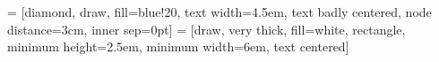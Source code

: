 

\usepackage[english]{babel} 
\usepackage{amsthm} 

\usepackage{algorithm}
\usepackage{algorithmic}
\usepackage{amssymb}
\usepackage{graphicx}
\usepackage{wrapfig}
\usepackage{blkarray, bigstrut}
\usepackage{bm}
\usepackage{ stmaryrd } 

\usepackage{romannum}

\usepackage[normalem]{ulem}
\usepackage{mathpartir}
\usepackage{color}
\usepackage{subcaption} %
\usepackage{mathtools}
\DeclarePairedDelimiter{\ceil}{\lceil}{\rceil}
\DeclarePairedDelimiter{\floor}{\lfloor}{\rfloor}
\usepackage{fourier} 
\usepackage{tikz}
\usetikzlibrary{shapes,arrows,snakes,decorations.markings}
\usetikzlibrary{svg.path,arrows.meta, calc} 

 = [diamond, draw, fill=blue!20, 
    text width=4.5em, text badly centered, node distance=3cm, inner sep=0pt]
 = [draw, very thick, fill=white, rectangle, 
    minimum height=2.5em, minimum width=6em, text centered]

